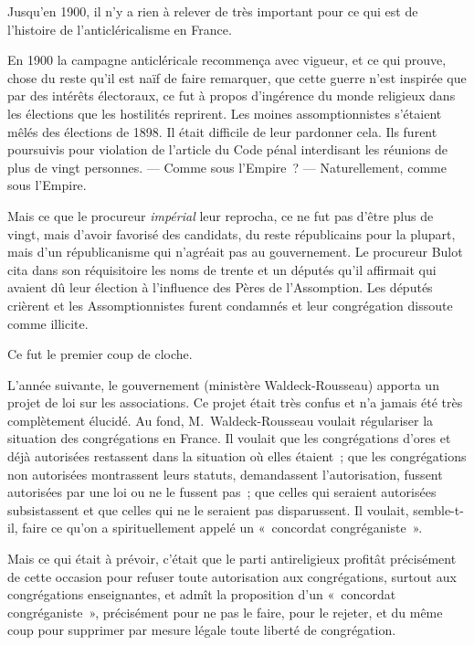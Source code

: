 \documentclass[french,twoside]{book} %
\begin{document}
\noindent Jusqu’en 1900, il n’y a rien à relever de très important pour ce qui est de l’histoire de l’anticléricalisme en France.\par
En 1900 la campagne anticléricale recommença avec vigueur, et ce qui prouve, chose du reste qu’il est naïf de faire remarquer, que cette guerre n’est inspirée que par des intérêts électoraux, ce fut à propos d’ingérence du monde religieux dans les élections que les hostilités reprirent. Les moines assomptionnistes s’étaient mêlés des élections de 1898. Il était difficile de leur pardonner cela.  Ils furent poursuivis pour violation de l’article du Code pénal interdisant les réunions de plus de vingt personnes. — Comme sous l’Empire ? — Naturellement, comme sous l’Empire.\par
Mais ce que le procureur {\itshape impérial} leur reprocha, ce ne fut pas d’être plus de vingt, mais d’avoir favorisé des candidats, du reste républicains pour la plupart, mais d’un républicanisme qui n’agréait pas au gouvernement. Le procureur Bulot cita dans son réquisitoire les noms de trente et un députés qu’il affirmait qui avaient dû leur élection à l’influence des Pères de l’Assomption. Les députés crièrent et les Assomptionnistes furent condamnés et leur congrégation dissoute comme illicite.\par
Ce fut le premier coup de cloche.\par
L’année suivante, le gouvernement (ministère Waldeck-Rousseau) apporta un projet de loi sur les associations. Ce projet était très confus et n’a jamais été très complètement élucidé. Au fond, M. Waldeck-Rousseau voulait régulariser la situation des congrégations en France. Il voulait que les congrégations d’ores et déjà autorisées restassent dans la situation où elles étaient ; que les congrégations non autorisées montrassent leurs statuts, demandassent l’autorisation, fussent autorisées par une loi ou ne le fussent pas ; que celles qui seraient autorisées subsistassent et que celles  qui ne le seraient pas disparussent. Il voulait, semble-t-il, faire ce qu’on a spirituellement appelé un « concordat congréganiste ».\par
Mais ce qui était à prévoir, c’était que le parti antireligieux profitât précisément de cette occasion pour refuser toute autorisation aux congrégations, surtout aux congrégations enseignantes, et admît la proposition d’un « concordat congréganiste », précisément pour ne pas le faire, pour le rejeter, et du même coup pour supprimer par mesure légale toute liberté de congrégation.\par
\end{document}
